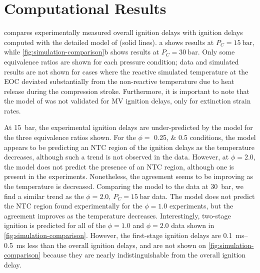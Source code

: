 \documentclass[letterpaper, review]{elsarticle}
\begin{document}
\section{Computational Results}\label{sec:computational-results}

 compares experimentally measured overall ignition delays with
ignition delays computed with the detailed model of \citet{Dievart2013} (solid lines).
a shows results at \(P_C = \SI{15}{\bar}\), while
\cref{fig:simulation-comparison}b shows results at \(P_C = \SI{30}{\bar}\). Only some equivalence
ratios are shown for each pressure condition; data and simulated results are not shown for cases
where the reactive simulated temperature at the EOC deviated substantially from the non-reactive
temperature due to heat release during the compression stroke. Furthermore, it is important to note
that the model of \citet{Dievart2013} was not validated for MV ignition delays, only for extinction
strain rates.

\begin{center}
    \captionsetup{type=figure}
    \resizebox{\textwidth}{!}{}
    \caption{Comparison of experimental and simulated results. a) \SI{15}{\bar}; b) \SI{30}{\bar}}
    \label{fig:simulation-comparison}
\end{center}

At \SI{15}{\bar}, the experimental ignition delays are under-predicted by the \citet{Dievart2013}
model for the three equivalence ratios shown. For the \(\phi =\) \numlist{0.25;0.5} conditions, the
model appears to be predicting an NTC region of the ignition delays as the temperature decreases,
although such a trend is not observed in the data. However, at \(\phi = 2.0\), the model does not
predict the presence of an NTC region, although one is present in the experiments. Nonetheless, the
agreement seems to be improving as the temperature is decreased. Comparing the \citet{Dievart2013}
model to the data at \SI{30}{\bar}, we find a similar trend as the \(\phi=2.0,\ P_C=\SI{15}{\bar}\)
data. The model does not predict the NTC region found experimentally for the \(\phi = 1.0\)
experiments, but the agreement improves as the temperature decreases. Interestingly, two-stage
ignition is predicted for all of the \(\phi=1.0\) and \(\phi=2.0\) data shown in
\cref{fig:simulation-comparison}. However, the first-stage ignition delays are
\SIrange{0.1}{0.5}{\ms} less than the overall ignition delays, and are not shown on
\cref{fig:simulation-comparison} because they are nearly indistinguishable from the overall ignition
delay.
\end{document}
